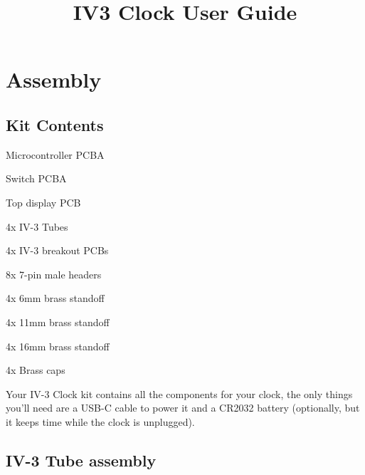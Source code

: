 \documentclass[12pt]{article}
\title{IV3 Clock User Guide}
\begin{document}
\maketitle

\tableofcontents
\newpage

\section{Assembly}
\subsection{Kit Contents}
\begin{description}[font=$\bullet$~\normalfont\scshape]
\item [] Microcontroller PCBA
\item [] Switch PCBA
\item [] Top display PCB
\item [] 4x IV-3 Tubes
\item [] 4x IV-3 breakout PCBs
\item [] 8x 7-pin male headers
\item [] 4x 6mm brass standoff
\item [] 4x 11mm brass standoff
\item [] 4x 16mm brass standoff
\item [] 4x Brass caps 
\end{description}


Your IV-3 Clock kit contains all the components for  your clock, the only things you'll need are a USB-C cable to power it and a CR2032 battery (optionally, but it keeps time while the clock is unplugged).

\subsection{IV-3 Tube assembly}
\renewcommand{\figurename}{Step}
\end{document}
